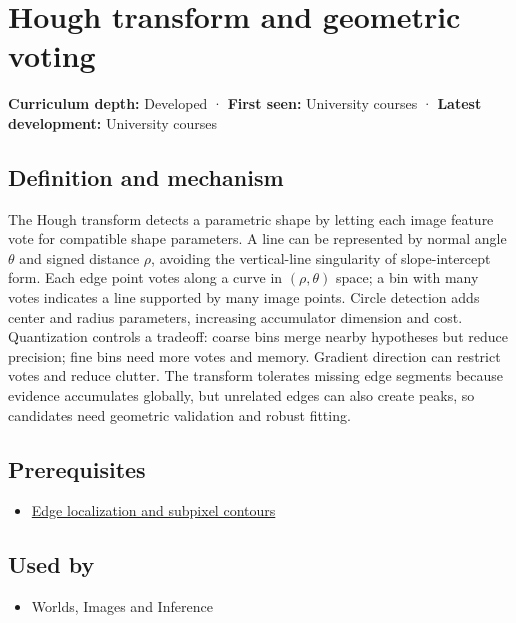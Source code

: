 \hypertarget{appendix-a5b0383b3b3e}{}\label{referencestart:appendix-a5b0383b3b3e}
\section{Hough transform and geometric voting}\label{appendix-a5b0383b3b3e-hough-transform-and-geometric-voting}

\textbf{Curriculum depth:} Developed · \textbf{First seen:} University courses · \textbf{Latest development:} University courses

\subsection{Definition and mechanism}\label{appendix-a5b0383b3b3e-definition-and-mechanism}

The Hough transform detects a parametric shape by letting each image feature vote for compatible shape parameters. A line can be represented by normal angle \(\theta\) and signed distance \(\rho\), avoiding the vertical-line singularity of slope-intercept form. Each edge point votes along a curve in \((\rho,\theta)\) space; a bin with many votes indicates a line supported by many image points. Circle detection adds center and radius parameters, increasing accumulator dimension and cost. Quantization controls a tradeoff: coarse bins merge nearby hypotheses but reduce precision; fine bins need more votes and memory. Gradient direction can restrict votes and reduce clutter. The transform tolerates missing edge segments because evidence accumulates globally, but unrelated edges can also create peaks, so candidates need geometric validation and robust fitting.

\subsection{Prerequisites}\label{appendix-a5b0383b3b3e-prerequisites}

\begin{itemize}
\tightlist
\item
  \hyperref[appendix-36022286b03e]{Edge localization and subpixel contours}
\end{itemize}

\subsection{Used by}\label{appendix-a5b0383b3b3e-used-by}

\begin{itemize}
\tightlist
\item
  {Worlds, Images and Inference}
\end{itemize}

